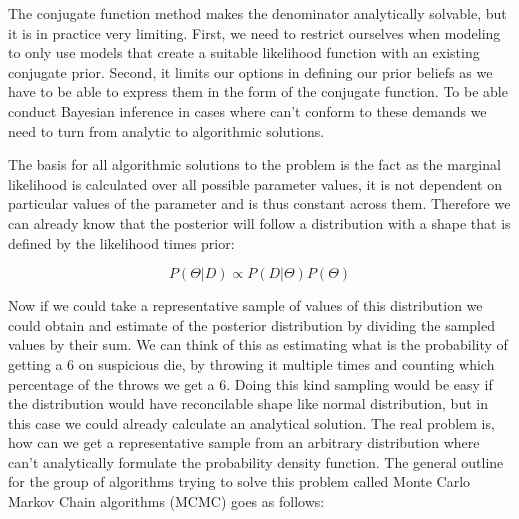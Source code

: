 \documentclass[12pt,a4paper,leqno]{report}
\theoremstyle{plain}
\theoremstyle{definition}
\theoremstyle{remark}
\begin{document}
The conjugate function method makes the denominator analytically solvable, but it
is in practice very limiting. First, we need to restrict ourselves when
modeling to only use models that create a suitable likelihood function with an existing
conjugate prior. Second, it limits our options in defining our prior
beliefs as we have to be able to express them in the form of the conjugate function. To
be able conduct Bayesian inference in cases where can't conform to these demands we need
to turn from analytic to algorithmic solutions.

The basis for all algorithmic solutions to the problem is the fact
as the marginal likelihood is calculated over all possible parameter values, it is
not dependent on particular values of the parameter and is thus constant across
them. Therefore we can already know that the posterior will follow a distribution
with a shape that is defined by the likelihood times prior:

\begin{def}\label{bayespropto}
    \begin{equation}
        P(\Theta|D) \propto P(D|\Theta)P(\Theta)
    \end{equation}
\end{def}

Now if we could take a representative sample of values of this distribution we could
obtain and estimate of the posterior distribution by dividing the sampled values by
their sum. We can think of this as estimating what is the probability of getting a 6 on
suspicious die, by throwing it multiple times and counting which percentage of the
throws we get a 6. Doing this kind sampling would be easy if the distribution would have reconcilable shape like
normal distribution, but in this case we could already calculate an analytical
solution. The real problem is, how can we get a representative sample from an arbitrary
distribution where can't analytically formulate the probability density function.
The general outline for the group of algorithms trying to solve this problem called
Monte Carlo Markov Chain algorithms (MCMC) goes as follows:
\end{document}
